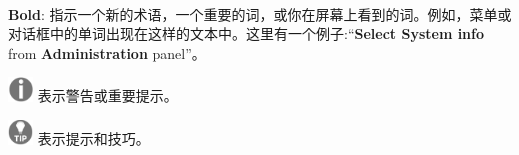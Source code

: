 \noindent\textbf{}\ \par
\textbf{Bold}: 指示一个新的术语，一个重要的词，或你在屏幕上看到的词。例如，菜单或对话框中的单词出现在这样的文本中。这里有一个例子:“\textbf{Select System info} from \textbf{Administration} panel”。
	
\includegraphics[width=0.05\textwidth]{images/warn}
表示警告或重要提示。
	
\includegraphics[width=0.05\textwidth]{images/tip}
表示提示和技巧。

\newpage
	
